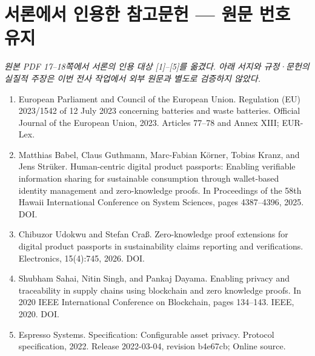 \documentclass[11pt,a4paper]{article}
\begin{document}
\section*{서론에서 인용한 참고문헌 — 원문 번호 유지}
\noindent\textit{원본 PDF 17--18쪽에서 서론의 인용 대상 [1]--[5]를 옮겼다. 아래 서지와 규정·문헌의 실질적 주장은 이번 전사 작업에서 외부 원문과 별도로 검증하지 않았다.}
\begin{enumerate}
    \item European Parliament and Council of the European Union.
          Regulation (EU) 2023/1542 of 12 July 2023 concerning batteries and waste batteries.
          Official Journal of the European Union, 2023.
          Articles 77--78 and Annex XIII; EUR-Lex.
    \item Matthias Babel, Claus Guthmann, Marc-Fabian Körner, Tobias Kranz, and Jens Strüker.
          Human-centric digital product passports: Enabling verifiable information sharing for sustainable consumption through wallet-based identity management and zero-knowledge proofs.
          In Proceedings of the 58th Hawaii International Conference on System Sciences, pages 4387--4396, 2025. DOI.
    \item Chibuzor Udokwu and Stefan Craß.
          Zero-knowledge proof extensions for digital product passports in sustainability claims reporting and verifications.
          Electronics, 15(4):745, 2026. DOI.
    \item Shubham Sahai, Nitin Singh, and Pankaj Dayama.
          Enabling privacy and traceability in supply chains using blockchain and zero knowledge proofs.
          In 2020 IEEE International Conference on Blockchain, pages 134--143. IEEE, 2020. DOI.
    \item Espresso Systems.
          Specification: Configurable asset privacy.
          Protocol specification, 2022.
          Release 2022-03-04, revision b4e67cb; Online source.
\end{enumerate}
\end{document}
